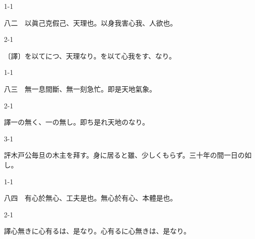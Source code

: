 \documentclass[tate,paper=b6j,jafontsize=9pt]{jlreq}
\begin{document}
\begin{azconvIndented}{1\zw}{-1\zw}

八二　以眞己克假己、天理也。以身我害心我、人欲也。

\end{azconvIndented}
\begin{azconvIndented}{2\zw}{-1\zw}

〔譯〕を以てにつ、天理なり。を以て心我をす、なり。

\end{azconvIndented}

\begin{azconvIndented}{1\zw}{-1\zw}

八三　無一息間斷、無一刻急忙。即是天地氣象。

\end{azconvIndented}
\begin{azconvIndented}{2\zw}{-1\zw}

譯一の無く、一の無し。即ち是れ天地のなり。

\end{azconvIndented}
\begin{azconvIndented}{3\zw}{-1\zw}

評木戸公毎旦の木主を拜す。身に居ると雖、少しくもらず。三十年の間一日の如し。

\end{azconvIndented}

\begin{azconvIndented}{1\zw}{-1\zw}

八四　有心於無\azconvKunten{\azconvIR}心、工夫是也。無心於有\azconvKunten{\azconvIR}心、本體是也。

\end{azconvIndented}
\begin{azconvIndented}{2\zw}{-1\zw}

譯心無きに心有るは、是なり。心有るに心無きは、是なり。

\end{azconvIndented}
\end{document}
